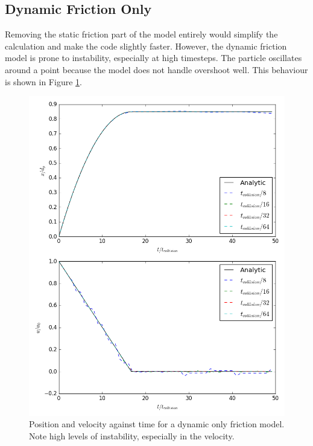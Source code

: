 \documentclass[a4paper,11pt,titlepage]{report}
\begin{document}
\subsection{Dynamic Friction Only}
Removing the static friction part of the model entirely would simplify the calculation and make the code slightly faster. However, the dynamic friction model is prone to instability, especially at high timesteps. The particle oscillates around a point because the model does not handle overshoot well. This behaviour is shown in Figure \ref{fig:dynamic_only}.
\begin{figure}[!ht]
\centering
\includegraphics[scale=0.65]{figures/friction_model/dynamic_only.png}
\caption{Position and velocity against time for a dynamic only friction model. Note high levels of instability, especially in the velocity.}
\label{fig:dynamic_only}
\end{figure}
\end{document}
